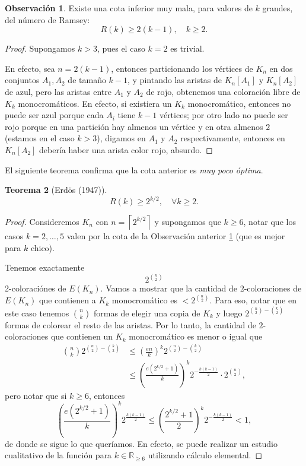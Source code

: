 \documentclass[12pt]{report}
\theoremstyle{plain}
\newtheorem{theorem}{Teorema}[section]
\theoremstyle{definition}
\newtheorem{obs}[theorem]{Observación}
\newcommand{\reals}{\mathbb{R}}
\newcommand{\ceil}[1]{\left\lceil #1  \right\rceil}
\begin{document}
\begin{obs}\label{obs:cota inferior trivial del numero de ramsey (orden lineal)}
Existe una cota inferior muy mala, para valores de $k$ grandes, del número de Ramsey:
\[
    R(k) \geq 2 (k-1), \quad k \geq 2.
\]
\end{obs}
\begin{proof}
Supongamos $k > 3$, pues el caso $k = 2$ es trivial.

En efecto, sea $n = 2 (k-1)$, entonces particionando los vértices de $K_n$ en dos conjuntos $A_1, A_2$ de tamaño $k-1$, y pintando las aristas de $K_n[A_1]$ y $K_n[A_2]$ de azul, pero las aristas entre $A_1$ y $A_2$ de rojo, obtenemos una coloración libre de $K_k$ monocromáticos. En efecto, si existiera un $K_k$ monocromático, entonces no puede ser azul porque cada $A_i$ tiene $k-1$ vértices; por otro lado no puede ser rojo porque en una partición hay almenos un vértice y en otra almenos $2$ (estamos en el caso $k > 3$), digamos en $A_1$ y $A_2$ respectivamente, entonces en $K_n [A_2]$ debería haber una arista color rojo, absurdo.
\end{proof}
El siguiente teorema confirma que la cota anterior es \textit{muy poco óptima}.

\begin{theorem}[Erdös (1947)]
\[
    R(k)  \geq 2^{k/2}, \quad \forall k \geq 2.
\]
\end{theorem}
\begin{proof}
Consideremos $K_n$ con $n = \ceil{2^{k/2}}$ y supongamos que $k \geq 6$, notar que los casos $k = 2 , \ldots, 5$ valen por la cota de la Observación anterior \ref{obs:cota inferior trivial del numero de ramsey (orden lineal)} (que es mejor para $k$ chico).

Tenemos exactamente
\[
    2^{\binom n 2}
\]
2-coloraciónes de $E(K_n)$. Vamos a mostrar que la cantidad de $2$-coloraciones de $E(K_n)$ que contienen a $K_k$ monocromático es $< 2^{\binom n 2}$. Para eso, notar que en este caso tenemos $\binom n k$ formas de elegir una copia de $K_k$ y luego $2^{\binom n 2 - \binom k 2}$ formas de colorear el resto de las aristas. Por lo tanto, la cantidad de $2$-coloraciones que contienen un $K_k$ monocromático es menor o igual que
\begin{align*}
\binom n k 2^{\binom n 2 - \binom k 2} &\leq \left (\frac{en}{k} \right )^{k} 2^{\binom n 2 - \binom k 2} \\
&\leq \left ( \frac{e (2^{k/2} + 1)}{k} \right )^k 2^{-\frac{k(k-1)}{2}} \cdot 2^ {\binom n 2},
\end{align*}
pero notar que si $k \geq 6$, entonces
\[
    \left ( \frac{e (2^{k/2} + 1)}{k} \right )^k 2^{\frac{k(k-1)}{2}}  \leq \left ( \frac{2^{k/2} + 1}{2} \right )^k 2^{- \frac{k(k-1)}{2}} < 1,
\]
de donde se sigue lo que queríamos. En efecto, se puede realizar un estudio cualitativo de la función para $k \in \reals_{\geq 6}$ utilizando cálculo elemental.
\end{proof}
\end{document}

